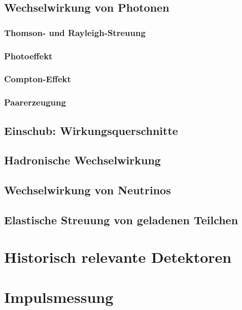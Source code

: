 \documentclass{article}
\begin{document}
\graphicspath{{bilder/1-2/}}
	\subsection{Wechselwirkung von Photonen}
		
			\subsubsection{Thomson- und Rayleigh-Streuung}
				
			\subsubsection{Photoeffekt}
				 
			\subsubsection{Compton-Effekt}
				
			\subsubsection{Paarerzeugung}
				
	\subsection{Einschub: Wirkungsquerschnitte}
		
				
\graphicspath{{bilder/1-345/}}
	\subsection{Hadronische Wechselwirkung}
		
	\subsection{Wechselwirkung von Neutrinos}
		
	\subsection{Elastische Streuung von geladenen Teilchen}
		
		
\section{Historisch relevante Detektoren}
\graphicspath{{bilder/2/}}
		
		
\section{Impulsmessung}
\graphicspath{{bilder/4/}}

\end{document}
